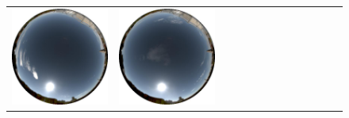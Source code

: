 \documentclass{report}
\begin{document}
\begin{figure}[!th]
\begin{tabular}{@{}rcccccccccccc@{}}
    \includegraphics[width=\customwidth]{./figures/database/20131106_115943.jpg} &
    \includegraphics[width=\customwidth]{./figures/database/20131106_122939.jpg} &

\end{tabular}
\end{figure}
\end{document}
